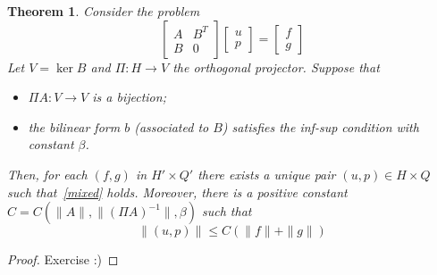 \documentclass{article}
\newtheorem{theorem}{Theorem}
\begin{document}
\begin{theorem}
    Consider the problem
    \begin{equation*}\label{mixed}
        \begin{bmatrix}
            A & B^{T}\\ 
            B & 0
        \end{bmatrix}
        \begin{bmatrix}
            u \\ p
        \end{bmatrix}
        =
        \begin{bmatrix}
            f \\ g
        \end{bmatrix}
    \end{equation*}
    Let \(V = \ker B\) and \(\Pi\colon H\to V\) the orthogonal
    projector. Suppose that
    \begin{itemize}
        \item \(\Pi A\colon V\to V\) is a bijection;
        \item the bilinear form \(b\) (associated to \(B\))
        satisfies the inf-sup condition with constant \(\beta\).
    \end{itemize}
    Then, for each \((f,g)\) in \(H'\times Q'\) there exists
    a unique pair \((u,p)\in H\times Q\) such that~\eqref{mixed}
    holds. Moreover, there is a positive constant
    \(C=C(\|A\|, \| (\Pi A)^{-1}\|, \beta)\) such that
    \begin{equation*}
        \| (u,p) \|
        \le
        C \left( \|f\| + \|g\| \right) 
    \end{equation*}
\end{theorem}
\begin{proof}
    Exercise :)
\end{proof}

\end{document}
